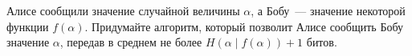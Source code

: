 Алисе сообщили значение случайной величины $\alpha$, а Бобу~--- значение некоторой функции
$f(\alpha)$. Придумайте алгоритм, который позволит Алисе сообщить Бобу значение $\alpha$, передав в
среднем не более $H(\alpha \mid f(\alpha)) + 1$ битов.
